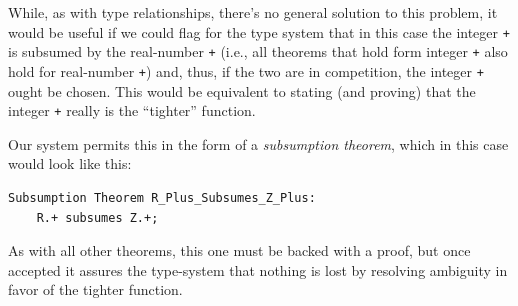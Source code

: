 While, as with type relationships, there's no general solution to this problem, it would be useful if we could flag for the type system that in this case the integer \texttt{+} is subsumed by the real-number \texttt{+} (i.e., all theorems that hold form integer \texttt{+} also hold for real-number \texttt{+}) and, thus, if the two are in competition, the integer \texttt{+} ought be chosen.  This would be equivalent to stating (and proving) that the integer \texttt{+} really is the ``tighter'' function.

Our system permits this in the form of a \emph{subsumption theorem}, which in this case would look like this:

\begin{lstlisting}
Subsumption Theorem R_Plus_Subsumes_Z_Plus:
	R.+ subsumes Z.+;
\end{lstlisting}

As with all other theorems, this one must be backed with a proof, but once accepted it assures the type-system that nothing is lost by resolving ambiguity in favor of the tighter function.

